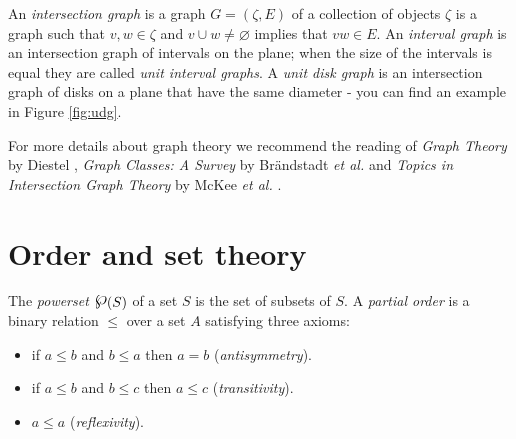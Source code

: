 An \emph{intersection graph} is a graph $G = (\zeta,E)$ of a collection of objects $\zeta$ is a graph such that $v,w \in \zeta$ and $v \cup w \neq \varnothing$ implies that $vw \in E$. An \emph{interval graph} is an intersection graph of intervals on the plane; when the size of the intervals is equal they are called \emph{unit interval graphs}. A \emph{unit disk graph} is an intersection graph of disks on a plane that have the same diameter - you can find an example in Figure \ref{fig:udg}.

For more details about graph theory we recommend the reading of \textit{Graph Theory} by Diestel \cite{GraphTheory2017}, \textit{Graph Classes: A Survey } by Brändstadt \textit{et al.} \cite{brandstadtGraphClassesSurvey1999} and \textit{Topics in Intersection Graph Theory} by McKee \textit{et al.} \cite{mckeeTopicsIntersectionGraph1999}.

\section{Order and set theory}

The \emph{powerset} $\powerset(S)$ of a set $S$ is the set of subsets of $S$. A \emph{partial order} is a binary relation $\leqslant$ over a set $A$ satisfying three axioms:

\begin{itemize}
  \item if $a \leqslant b$ and $b \leqslant a$ then $a = b$ (\emph{antisymmetry}).
  \item if $a \leqslant b$ and $b \leqslant c$ then $a \leqslant c$ (\emph{transitivity}).
  \item $a \leqslant a$ (\emph{reflexivity}).
\end{itemize}

